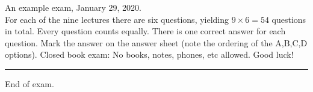 \documentclass[10pt]{article}
\begin{document}
An example exam, January 29, 2020. \\

For each of the nine lectures there are six questions, yielding $9 \times 6 =54$ questions in total. Every question counts equally. There is one correct answer for each question. Mark the answer on the answer sheet (note the ordering of the A,B,C,D options). Closed book exam: No books, notes, phones, etc allowed. Good luck! 

\noindent\rule{\textwidth}{1pt} 



End of exam.
\end{document}
